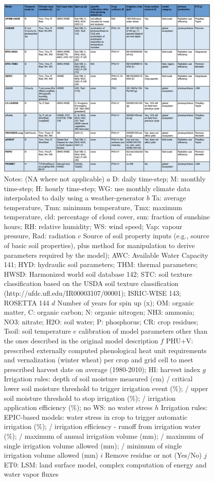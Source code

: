 \documentclass[10pt]{article}
\begin{document}
\begin{figure}[h!]
    \centering
    \includegraphics[width=\textwidth]{model_table.png}
    \caption{
        Notes: (NA where not applicable)
        $a$ D: daily time-step; M: monthly time-step; H: hourly time-step; WG: use monthly climate data interpolated to daily using a weather-generator
        $b$ Ta: average temperature, Tmn: minimum temperature, Tmx: maximum temperature, cld: percentage of cloud cover, sun: fraction of sunshine hours; RH: relative humidity; WS: wind speed; Vap: vapour pressure, Rad: radiation
        $c$ Source of soil property inputs (e.g., source of basic soil properties), plus method for manipulation to derive parameters required by the model); AWC: Available Water Capacity 141; HYD: hydraulic soil parameters; THM: thermal parameters; HWSD: Harmonized world soil database 142; STC: soil texture classification based on the USDA soil texture classification (http://ufdc.ufl.edu/IR00003107/00001); ISRIC-WISE 143; ROSETTA 144
        $d$ Number of years for spin up (x); OM: organic matter, C: organic carbon; N: organic nitrogen; NH3: ammonia; NO3: nitrate; H2O: soil water; P: phosphorus; CR: crop residues; Tsoil: soil temperature
        $e$ calibration of model parameters other than the ones described in the original model description
        $f$ PHU+V: prescribed externally computed phenological heat unit requirements and vernalization (winter wheat) per crop and grid cell to meet prescribed harvest date on average (1980-2010); HI: harvest index
        $g$ Irrigation rules: depth of soil moisture measured (cm) / critical lower soil moisture threshold to trigger irrigation event (\%); / upper soil moisture threshold to stop irrigation (\%); / irrigation application efficiency (\%); no WS: no water stress
        $h$ Irrigation rules: EPIC-based models: water stress in crop to trigger automatic irrigation (\%); / irrigation efficiency - runoff from irrigation water (\%); / maximum of annual irrigation volume (mm); / maximum of single irrigation volume allowed (mm); / minimum of single irrigation volume allowed (mm)
        $i$ Remove residue or not (Yes/No)
        $j$ ET0: LSM: land surface model, complex computation of energy and water vapor fluxes
    }
    \label{fig:models}
\end{figure}
\end{document}
